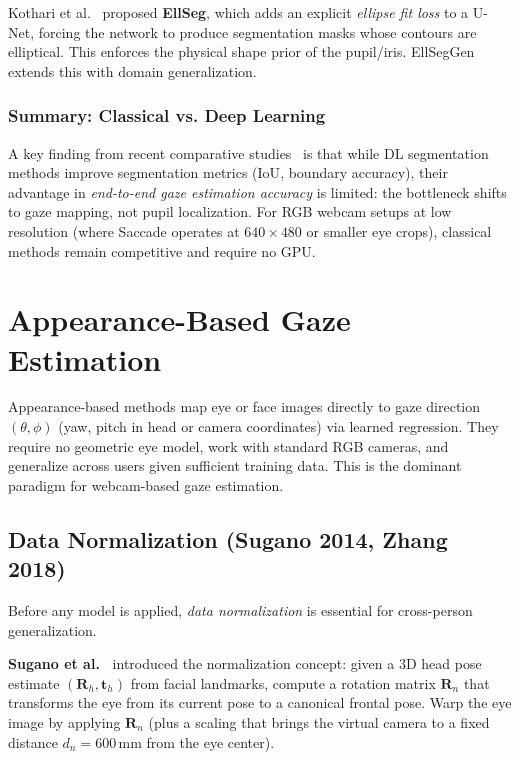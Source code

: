 \documentclass[11pt,a4paper]{article}
\begin{document}
Kothari et al.~\cite{ellseg2021} proposed \textbf{EllSeg}, which adds an explicit \textit{ellipse fit loss} to a U-Net, forcing the network to produce segmentation masks whose contours are elliptical.
This enforces the physical shape prior of the pupil/iris.
EllSegGen extends this with domain generalization.

\subsubsection{Summary: Classical vs. Deep Learning}

A key finding from recent comparative studies~\cite{pupildetect_review2024} is that while DL segmentation methods improve segmentation metrics ($\text{IoU}$, boundary accuracy), their advantage in \textit{end-to-end gaze estimation accuracy} is limited: the bottleneck shifts to gaze mapping, not pupil localization.
For RGB webcam setups at low resolution (where Saccade operates at $640\times480$ or smaller eye crops), classical methods remain competitive and require no GPU.

\section{Appearance-Based Gaze Estimation}
\label{sec:appearance}

Appearance-based methods map eye or face images directly to gaze direction $(\theta, \phi)$ (yaw, pitch in head or camera coordinates) via learned regression.
They require no geometric eye model, work with standard RGB cameras, and generalize across users given sufficient training data.
This is the dominant paradigm for webcam-based gaze estimation.

\subsection{Data Normalization (Sugano 2014, Zhang 2018)}

Before any model is applied, \textit{data normalization} is essential for cross-person generalization.

\textbf{Sugano et al.~\cite{sugano2014learning}} introduced the normalization concept:
given a 3D head pose estimate $(\mathbf{R}_h, \mathbf{t}_h)$ from facial landmarks, compute a rotation matrix $\mathbf{R}_n$ that transforms the eye from its current pose to a canonical frontal pose.
Warp the eye image by applying $\mathbf{R}_n$ (plus a scaling that brings the virtual camera to a fixed distance $d_n = 600\,\text{mm}$ from the eye center).
\end{document}

